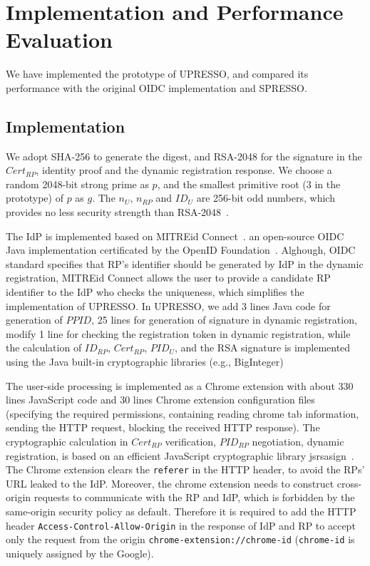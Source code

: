 \section{Implementation and Performance Evaluation}
\label{sec:implementation}
We have implemented the prototype of UPRESSO, and compared its performance with the original OIDC implementation and SPRESSO.

\subsection{Implementation}
We adopt SHA-256 to generate the digest, and  RSA-2048 for the signature in  the $Cert_{RP}$, identity proof and the dynamic registration response. We  choose a random 2048-bit strong prime as $p$, and the smallest primitive root (3 in the prototype)  of $p$ as $g$. The  $n_U$, $n_{RP}$ and $ID_U$  are 256-bit odd numbers, which provides no less security strength than RSA-2048~\cite{barkerecommendation}.

The IdP is implemented based on MITREid Connect~\cite{MITREid}. an open-source OIDC Java implementation certificated by the OpenID Foundation~\cite{OIDF}. Alghough, OIDC standard specifies that RP's identifier should be generated by IdP in the dynamic registration, MITREid Connect allows the user to provide a candidate RP identifier to the IdP who checks the uniqueness, which simplifies the implementation of UPRESSO. In UPRESSO, we add 3 lines Java code for generation of $PPID$, 25 lines for generation of signature in dynamic registration, modify 1 line for checking the registration token in dynamic registration, while the calculation of $ID_{RP}$, $Cert_{RP}$,  $PID_U$, and the RSA signature is implemented using the Java built-in cryptographic libraries (e.g., BigInteger)

The user-side processing is implemented as a Chrome extension with about 330 lines JavaScript code and 30 lines  Chrome extension configuration files (specifying the required permissions, containing reading chrome tab information, sending the HTTP request, blocking the received HTTP response). The cryptographic calculation in $Cert_{RP}$ verification, $PID_{RP}$ negotiation, dynamic registration, is based on an efficient JavaScript cryptographic library  jsrsasign~\cite{jsrsasign}. The Chrome extension clears the \verb+referer+ in the HTTP header, to avoid the RPs' URL leaked to the IdP. Moreover, the chrome extension needs to construct cross-origin requests to communicate with the RP and IdP, which is forbidden by the same-origin security policy as default. Therefore it is required to add the HTTP header \verb+Access-Control-Allow-Origin+ in the response of IdP and RP to accept only the request from the origin \verb+chrome-extension://chrome-id+ (\verb+chrome-id+ is uniquely assigned by the Google).


